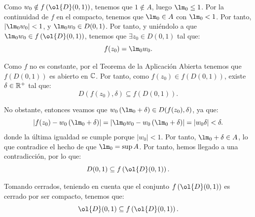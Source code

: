 \documentclass[12pt]{article}
\begin{document}
\begin{ejercicio}[2.5 puntos]
\begin{enumerate}
\begin{description}
                Como $w_0 \notin f\left(\ol{D}(0, 1)\right)$, tenemos que $1\notin A$, luego $\lm_0 \leq 1$. Por la continuidad de $f$ en el compacto, tenemos que $\lm_0\in A$ con $\lm_0 < 1$. Por tanto, $|\lm_0 w_0| < 1$, y $\lm_0 w_0 \in D(0, 1)$. Por tanto, y uniéndolo a que $\lm_0 w_0 \in f\left(\ol{D}(0, 1)\right)$, tenemos que $\exists z_0 \in D(0, 1)$ tal que:
                \begin{equation*}
                    f(z_0) = \lm_0 w_0.
                \end{equation*}

                Como $f$ no es constante, por el Teorema de la Aplicación Abierta tenemos que $f\left(D(0, 1)\right)$ es abierto en $\mathbb{C}$. Por tanto, como $f(z_0)\in f\left(D(0, 1)\right)$, existe $\delta\in \mathbb{R}^+$ tal que:
                \begin{equation*}
                    D(f(z_0), \delta) \subseteq f\left(D(0, 1)\right).
                \end{equation*}

                No obstante, entonces veamos que $w_0\left(\lm_0 + \delta\right)\in D(f(z_0), \delta)$, ya que:
                \begin{equation*}
                    \left|f(z_0) - w_0\left(\lm_0 + \delta\right)\right| = \left|\lm_0 w_0 - w_0\left(\lm_0 + \delta\right)\right| = |w_0\delta| < \delta.
                \end{equation*}
                donde la última igualdad se cumple porque $|w_0|<1$. Por tanto, $\lm_0+\delta \in A$, lo que contradice el hecho de que $\lm_0 = \sup A$. Por tanto, hemos llegado a una contradicción, por lo que:
                \begin{equation*}
                    D(0, 1) \subseteq f\left(\ol{D}(0, 1)\right).
                \end{equation*}

                Tomando cerrados, teniendo en cuenta que el conjunto $f\left(\ol{D}(0, 1)\right)$ es cerrado por ser compacto, tenemos que:
                \begin{equation*}
                    \ol{D}(0, 1) \subseteq f\left(\ol{D}(0, 1)\right).
                \end{equation*}
            \end{description}
        \end{enumerate}
    \end{ejercicio}
\end{document}
